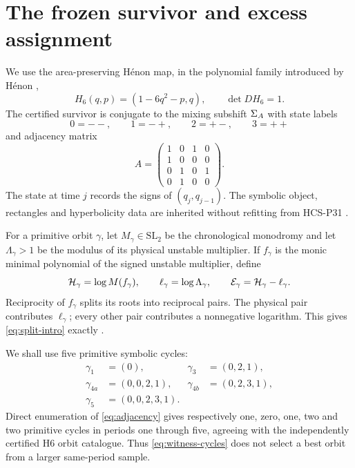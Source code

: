 \section{The frozen survivor and excess assignment}

We use the area-preserving H\'enon map, in the polynomial family introduced
by H\'enon \citep{Henon1976},
\begin{equation}\label{eq:henon}
 H_6(q,p)=(1-6q^2-p,q),
 \qquad \det DH_6=1.
\end{equation}
The certified survivor is conjugate to the mixing subshift \(\Sigma_A\) with
state labels
\[
 0={--},\qquad 1={-+},\qquad 2={+-},\qquad 3={++}
\]
and adjacency matrix
\begin{equation}\label{eq:adjacency}
 A=
 \begin{pmatrix}
 1&0&1&0\\
 1&0&0&0\\
 0&1&0&1\\
 0&1&0&0
 \end{pmatrix}.
\end{equation}
The state at time \(j\) records the signs of \((q_j,q_{j-1})\).
The symbolic object, rectangles and hyperbolicity data are inherited without
refitting from HCS-P31 \citep{WangP31}.

For a primitive orbit \(\gamma\), let \(M_\gamma\in\mathrm{SL}_2\) be the
chronological monodromy and let \(\Lambda_\gamma>1\) be the modulus of its
physical unstable multiplier.  If \(f_\gamma\) is the monic minimal
polynomial of the signed unstable multiplier, define
\begin{equation}\label{eq:height}
 \mathcal H_\gamma=\log M(f_\gamma),
 \qquad
 \ell_\gamma=\log\Lambda_\gamma,
 \qquad
 \mathcal E_\gamma=\mathcal H_\gamma-\ell_\gamma.
\end{equation}
Reciprocity of \(f_\gamma\) splits its roots into reciprocal pairs.  The
physical pair contributes \(\ell_\gamma\); every other pair contributes a
nonnegative logarithm.  This gives \eqref{eq:split-intro} exactly
\citep{WangP48,WangP54}.

We shall use five primitive symbolic cycles:
\begin{equation}\label{eq:witness-cycles}
\begin{aligned}
 \gamma_1&=(0),
 &\gamma_3&=(0,2,1),\\
 \gamma_{4a}&=(0,0,2,1),
 &\gamma_{4b}&=(0,2,3,1),\\
 \gamma_5&=(0,0,2,3,1).
\end{aligned}
\end{equation}
Direct enumeration of \eqref{eq:adjacency} gives respectively one, zero, one,
two and two primitive cycles in periods one through five, agreeing with the
independently certified H6 orbit catalogue.  Thus \eqref{eq:witness-cycles}
does not select a best orbit from a larger same-period sample.
